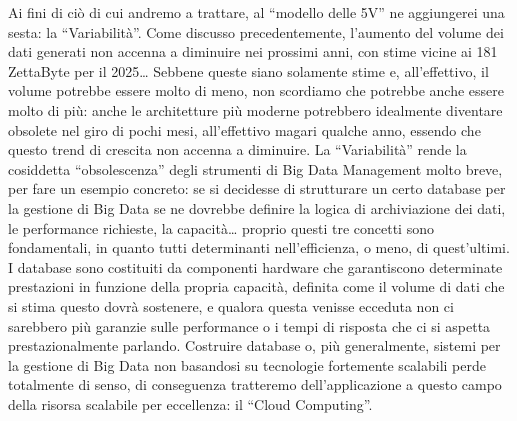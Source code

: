 \documentclass[a4paper,12pt]{report}
\begin{document}
 Ai fini di ciò di cui andremo a trattare, al “modello delle 5V” ne aggiungerei una sesta: la “Variabilità”. Come discusso precedentemente, l’aumento del volume dei dati generati non accenna a diminuire nei prossimi anni, con stime vicine ai 181 ZettaByte per il 2025… Sebbene queste siano solamente stime e, all’effettivo, il volume potrebbe essere molto di meno, non scordiamo che potrebbe anche essere molto di più: anche le architetture più moderne potrebbero idealmente diventare obsolete nel giro di pochi mesi, all’effettivo magari qualche anno, essendo che questo trend di crescita non accenna a diminuire. La “Variabilità” rende la cosiddetta “obsolescenza” degli strumenti di Big Data Management molto breve, per fare un esempio concreto: se si decidesse di strutturare un certo database per la gestione di Big Data se ne dovrebbe definire la logica di archiviazione dei dati, le performance richieste, la capacità… proprio questi tre concetti sono fondamentali, in quanto tutti determinanti nell’efficienza, o meno, di quest’ultimi. I database sono costituiti da componenti hardware che garantiscono determinate prestazioni in funzione della propria capacità, definita come il volume di dati che si stima questo dovrà sostenere, e qualora questa venisse ecceduta non ci sarebbero più garanzie sulle performance o i tempi di risposta che ci si aspetta prestazionalmente parlando. Costruire database o, più generalmente, sistemi per la gestione di Big Data non basandosi su tecnologie fortemente scalabili perde totalmente di senso, di conseguenza tratteremo dell’applicazione a questo campo della risorsa scalabile per eccellenza: il “Cloud Computing”.
\end{document}
